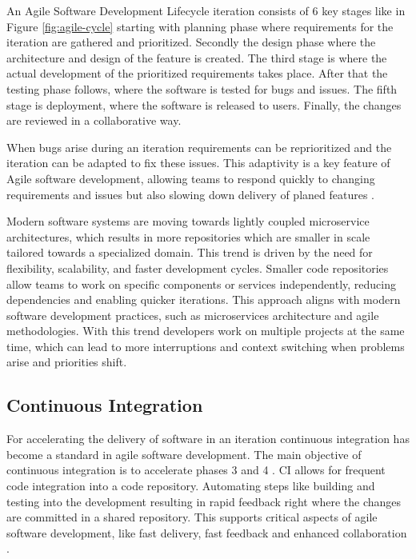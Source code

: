 An Agile Software Development Lifecycle iteration consists of 6 key stages like in Figure \ref{fig:agile-cycle} starting with planning phase where requirements for the iteration are gathered and prioritized. Secondly the design phase where the architecture and design of the feature is created. The third stage is where the actual development of the prioritized requirements takes place. After that the testing phase follows, where the software is tested for bugs and issues. The fifth stage is deployment, where the software is released to users. Finally, the changes are reviewed in a collaborative way.

When bugs arise during an iteration requirements can be reprioritized and the iteration can be adapted to fix these issues. This adaptivity is a key feature of Agile software development, allowing teams to respond quickly to changing requirements and issues but also slowing down delivery of planed features \cite{rupareliaSoftwareDevelopmentLifecycle2010}.

Modern software systems are moving towards lightly coupled microservice architectures, which results in more repositories which are smaller in scale tailored towards a specialized domain. This trend is driven by the need for flexibility, scalability, and faster development cycles. Smaller code repositories allow teams to work on specific components or services independently, reducing dependencies and enabling quicker iterations. This approach aligns with modern software development practices, such as microservices architecture and agile methodologies.
With this trend developers work on multiple projects at the same time, which can lead to more interruptions and context switching when problems arise and priorities shift.

\subsection{Continuous Integration}

For accelerating the delivery of software in an iteration continuous integration has become a standard in agile software development. The main objective of continuous integration is to accelerate phases 3 and 4 \cite{ugwuezeContinuousIntegrationDeployment2024}. CI allows for frequent code integration into a code repository. Automating steps like building and testing into the development resulting in rapid feedback right where the changes are committed in a shared repository. This supports critical aspects of agile software development, like fast delivery, fast feedback and enhanced collaboration \cite{ugwuezeContinuousIntegrationDeployment2024}.

